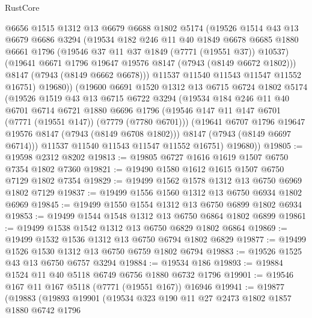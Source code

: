 \begin{lexlean}{RustCore}
\begin{coremodule}
          @6656
          @1515
          @1312
          @13
          @6679
          @6688
          @1802
          @5174
          (@19526
            @1514
            @43
            @13
            @6679
            @6686
            @3294
            (@19534
              @182
              @246
              @11
              @40
              @1849
              @6678
              @6685
              @1880
              @6661
              @1796
              (@19546 @37 @11 @37 @1849 (@7771 (@19551 @37)) @10537)
              (@19641 @6671 @1796 @19647 @19576 @8147 (@7943 (@8149 @6672 @1802)))
              @8147
              (@7943 (@8149 @6662 @6678)))
            @11537
            @11540
            @11543
            @11547
            @11552
            @16751)
          @19680))
      (@19600
        @6691
        @1520
        @1312
        @13
        @6715
        @6724
        @1802
        @5174
        (@19526
          @1519
          @43
          @13
          @6715
          @6722
          @3294
          (@19534
            @184
            @246
            @11
            @40
            @6701
            @6714
            @6721
            @1880
            @6696
            @1796
            (@19546 @147 @11 @147 @6701 (@7771 (@19551 @147)) (@7779 (@7780 @6701)))
            (@19641 @6707 @1796 @19647 @19576 @8147 (@7943 (@8149 @6708 @1802)))
            @8147
            (@7943 (@8149 @6697 @6714)))
          @11537
          @11540
          @11543
          @11547
          @11552
          @16751)
        @19680))
@19805 := @19598 @2312 @8202
@19813 := @19805 @6727 @1616 @1619 @1507 @6750 @7354 @1802 @7360
@19821 := @19490 @1580 @1612 @1615 @1507 @6750 @7129 @1802 @7354
@19829 := @19499 @1562 @1578 @1312 @13 @6750 @6969 @1802 @7129
@19837 := @19499 @1556 @1560 @1312 @13 @6750 @6934 @1802 @6969
@19845 := @19499 @1550 @1554 @1312 @13 @6750 @6899 @1802 @6934
@19853 := @19499 @1544 @1548 @1312 @13 @6750 @6864 @1802 @6899
@19861 := @19499 @1538 @1542 @1312 @13 @6750 @6829 @1802 @6864
@19869 := @19499 @1532 @1536 @1312 @13 @6750 @6794 @1802 @6829
@19877 := @19499 @1526 @1530 @1312 @13 @6750 @6759 @1802 @6794
@19883 := @19526 @1525 @43 @13 @6750 @6757 @3294
@19884 := @19534 @186
@19893 := @19884 @1524 @11 @40 @5118 @6749 @6756 @1880 @6732 @1796
@19901 := @19546 @167 @11 @167 @5118 (@7771 (@19551 @167)) @16946
@19941 := @19877
    (@19883
      (@19893
        @19901
        (@19534
          @323
          @190
          @11
          @27
          @2473
          @1802
          @1857
          @1880
          @6742
          @1796

\end{coremodule}
\end{lexlean}
